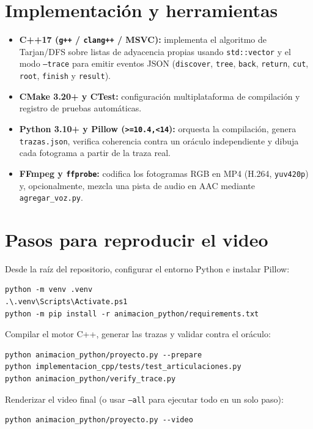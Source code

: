 \documentclass[11pt,a4paper]{article}
\begin{document}
\section{Implementación y herramientas}
\begin{itemize}
  \item \textbf{C++17 (\texttt{g++} / \texttt{clang++} / MSVC):} implementa el
    algoritmo de Tarjan/DFS sobre listas de adyacencia propias usando
    \texttt{std::vector} y el modo \texttt{--trace} para emitir eventos JSON
    (\texttt{discover}, \texttt{tree}, \texttt{back}, \texttt{return},
    \texttt{cut}, \texttt{root}, \texttt{finish} y \texttt{result}).
  \item \textbf{CMake 3.20+ y CTest:} configuración multiplataforma de
    compilación y registro de pruebas automáticas.
  \item \textbf{Python 3.10+ y Pillow (\texttt{>=10.4,<14}):} orquesta la
    compilación, genera \texttt{trazas.json}, verifica coherencia contra un
    oráculo independiente y dibuja cada fotograma a partir de la traza real.
  \item \textbf{FFmpeg y \texttt{ffprobe}:} codifica los fotogramas RGB en
    MP4 (H.264, \texttt{yuv420p}) y, opcionalmente, mezcla una pista de audio
    en AAC mediante \texttt{agregar\_voz.py}.
\end{itemize}

\section{Pasos para reproducir el video}
Desde la raíz del repositorio, configurar el entorno Python e instalar Pillow:
\begin{verbatim}
python -m venv .venv
.\.venv\Scripts\Activate.ps1
python -m pip install -r animacion_python/requirements.txt
\end{verbatim}

Compilar el motor C++, generar las trazas y validar contra el oráculo:
\begin{verbatim}
python animacion_python/proyecto.py --prepare
python implementacion_cpp/tests/test_articulaciones.py
python animacion_python/verify_trace.py
\end{verbatim}

Renderizar el video final (o usar \texttt{--all} para ejecutar todo en un solo paso):
\begin{verbatim}
python animacion_python/proyecto.py --video
\end{verbatim}
\end{document}
